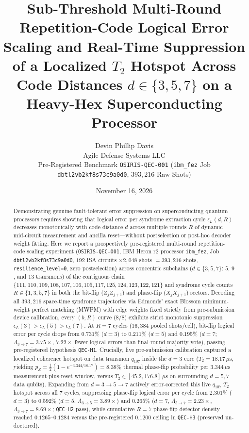 \documentclass[11pt,twocolumn]{article}
\title{\textbf{Sub-Threshold Multi-Round Repetition-Code Logical Error Scaling and Real-Time Suppression of a Localized $T_2$ Hotspot Across Code Distances $d \in \{3, 5, 7\}$ on a Heavy-Hex Superconducting Processor}}
\author{Devin Phillip Davis\\
\small Agile Defense Systems LLC\\
\small Pre-Registered Benchmark \texttt{OSIRIS-QEC-001} (\texttt{ibm\_fez} Job \texttt{dbtl2vb2kf8s73c9a0d0}, $393{,}216$ Raw Shots)}
\date{November 16, 2026}
\begin{document}
\maketitle

\begin{abstract}
Demonstrating genuine fault-tolerant error suppression on superconducting quantum processors requires showing that logical error per syndrome extraction cycle $\epsilon_L(d, R)$ decreases monotonically with code distance $d$ across multiple rounds $R$ of dynamic mid-circuit measurement and ancilla reset---without postselection or post-hoc decoder weight fitting. Here we report a prospectively pre-registered multi-round repetition-code scaling experiment (\texttt{OSIRIS-QEC-001}, IBM Heron r2 processor \texttt{ibm\_fez}, Job \texttt{dbtl2vb2kf8s73c9a0d0}, $192$ ISA circuits $\times 2{,}048$ shots $= 393{,}216$ shots, \texttt{resilience\_level=0}, zero postselection) across concentric subchains ($d \in \{3, 5, 7\}$: $5$, $9$, and $13$ transmons) of the contiguous chain $\{111,110,109,108,107,106,105,117,125,124,123,122,121\}$ and syndrome cycle counts $R \in \{1, 3, 5, 7\}$ in both the bit-flip ($Z_j Z_{j+1}$) and phase-flip ($X_j X_{j+1}$) sectors. Decoding all $393{,}216$ space-time syndrome trajectories via Edmonds' exact Blossom minimum-weight perfect matching (MWPM) with edge weights fixed strictly from pre-submission device calibration, every $(b, R)$ curve ($8/8$) exhibits strict monotonic suppression $\epsilon_L(3) > \epsilon_L(5) > \epsilon_L(7)$. At $R=7$ cycles ($16{,}384$ pooled shots/cell), bit-flip logical error per cycle drops from $0.731\%$ ($d=3$) to $0.211\%$ ($d=5$) and $0.195\%$ ($d=7$; $\Lambda_{3\to 7}=3.75\times$, $7.22\times$ fewer logical errors than final-round majority vote), passing pre-registered hypothesis \texttt{QEC-H1}. Crucially, live pre-submission calibration captured a localized coherence hotspot on data transmon $q_{107}$ inside the $d=3$ core ($T_2 = 18.17\,\mu\text{s}$, yielding $p_Z = \frac{1}{2}(1 - e^{-3.344/18.17}) = 8.38\%$ thermal phase-flip probability per $3.344\,\mu\text{s}$ measurement-plus-reset window, versus $T_2 \in [45.2, 176.8]\,\mu\text{s}$ on surrounding $d=5, 7$ data qubits). Expanding from $d=3 \to 5 \to 7$ actively error-corrected this live $q_{107}$ $T_2$ hotspot across all $7$ cycles, suppressing phase-flip logical error per cycle from $2.301\%$ ($d=3$) to $0.592\%$ ($d=5$, $\Lambda_{3\to 5}=3.89\times$) and $0.265\%$ ($d=7$, $\Lambda_{5\to 7}=2.23\times$, $\Lambda_{3\to 7}=8.69\times$; \texttt{QEC-H2} pass), while cumulative $R=7$ phase-flip detector density reached $0.1265\text{--}0.1284$ versus the pre-registered $0.1200$ ceiling in \texttt{QEC-H3} (preserved un-doctored).
\end{abstract}
\end{document}
